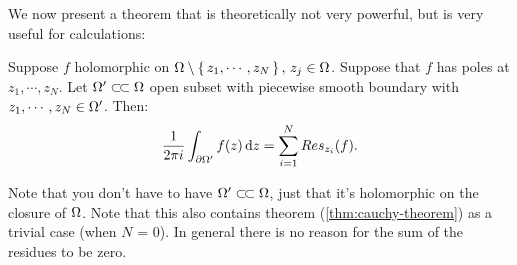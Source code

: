 We now present a theorem that is theoretically not very powerful, but is very useful for calculations:


\begin{theorem}\label{thm:residue-formula}

Suppose $f$ holomorphic on $\Omega \setminus \set{ z_1,\cdots, z_N}, \, z_j \in \Omega $. Suppose that $f$ has poles at $z_1,\cdots, z_N$. Let $\om ' \ssubset \om$ open subset with piecewise smooth boundary with $z_1,\cdots, z_N \in \Omega '$. Then:
\begin{align*}
    \frac{1}{2\pi i} \int_{\partial \om '} f(z) \dif z = \sum_{i=1}^N Res_{z_i} (f).
\end{align*}

\end{theorem}

\begin{note}
Note that you don't have to have $\om ' \ssubset \om$, just that it's holomorphic on the closure of $\Omega$. Note that this also contains theorem (\ref{thm:cauchy-theorem}) as a trivial case (when $N$ = 0). In general there is no reason for the sum of the residues to be zero.
\end{note}





